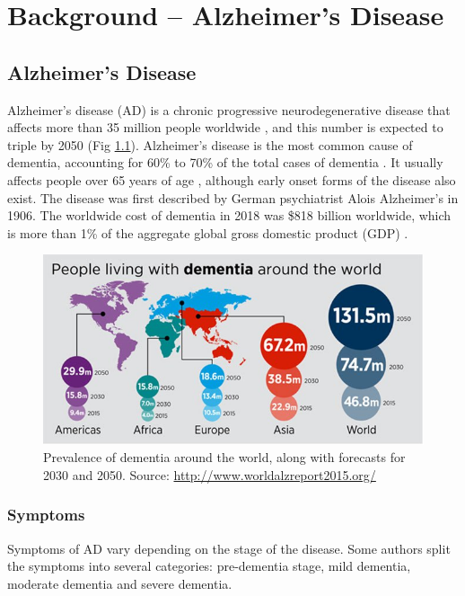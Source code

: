 \chapter{Background -- Alzheimer's Disease}
\label{chapter:bck}

\section{Alzheimer's Disease}
\label{sec:bckAd}

Alzheimer's disease (AD) is a chronic progressive neurodegenerative disease that affects more than 35 million people worldwide \cite{querfurth2010mechanisms}, and this number is expected to triple by 2050 (Fig \ref{fig:adPrevalence}). Alzheimer's disease is the most common cause of dementia, accounting for 60\% to 70\% of the total cases of dementia \cite{Burns2009,world2013dementia}. It usually affects people over 65 years of age \cite{Burns2009,world2013dementia}, although early onset forms of the disease also exist. The disease was first described by German psychiatrist Alois Alzheimer's in 1906. The worldwide cost of dementia in 2018 was \$818 billion worldwide, which is more than 1\% of the aggregate global gross domestic product (GDP) \cite{princeglobal}.

\begin{figure}
\centering
\includegraphics[width=0.7 \textwidth]{images/dementia_globally}
\caption[Prevalence of dementia around the world]{Prevalence of dementia around the world, along with forecasts for 2030 and 2050. Source: \url{http://www.worldalzreport2015.org/}}
\label{fig:adPrevalence}
\end{figure}


\subsection{Symptoms}
\label{sec:bckSym}

Symptoms of AD vary depending on the stage of the disease. Some authors \cite{forstl1999clinical} split the symptoms into several categories: pre-dementia stage, mild dementia, moderate dementia and severe dementia. 

